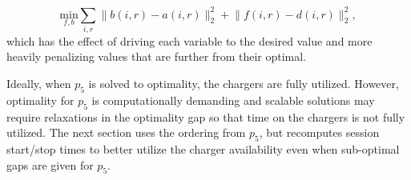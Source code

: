 \begin{equation}\label{eqn:assignment:eqn6}
	\underset{f,b}{\text{min}} \sum_{i,r}\lVert b(i,r) - a(i,r)\rVert_2^2 + \lVert f(i,r) - d(i,r) \rVert_2^2,
\end{equation}
which has the effect of driving each variable to the desired value and more heavily penalizing values that are further from their optimal.
\par Ideally, when $p_5$ is solved to optimality, the chargers are fully utilized. However, optimality for $p_5$ is computationally demanding and scalable solutions may require relaxations in the optimality gap so that time on the chargers is not fully utilized. The next section uses the ordering from $p_5$, but recomputes session start/stop times to better utilize the charger availability even when sub-optimal gaps are given for $p_5$.
\\[0.1in]  

